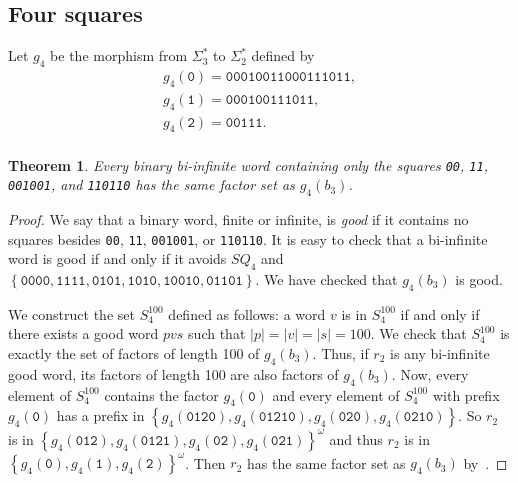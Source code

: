 \documentclass{article}
\def\acc#1{\left\{ #1 \right\}}
\theoremstyle{plain}
\newtheorem{theorem}{Theorem}
\theoremstyle{definition}
\theoremstyle{remark}
\begin{document}
\subsection{Four squares}\label{ssec:4sq}
Let $g_4$ be the morphism from $\Sigma_3^*$ to $\Sigma_2^*$ defined by
$$\begin{array}{l}
 g_4(\texttt{0})=\texttt{00010011000111011},\\
 g_4(\texttt{1})=\texttt{000100111011},\\
 g_4(\texttt{2})=\texttt{00111}.\\
\end{array}$$

\begin{theorem}
Every binary bi-infinite word containing only the squares \textnormal{\texttt{00}}, \textnormal{\texttt{11}},
\textnormal{\texttt{001001}}, and \textnormal{\texttt{110110}} has the same factor set as $g_4(b_3)$.
\end{theorem}

\begin{proof}
We say that a binary word, finite or infinite, is \emph{good} if it contains no squares besides 
\texttt{00}, \texttt{11}, \texttt{001001}, or \texttt{110110}.
It is easy to check that a bi-infinite word is good if and only if it
avoids $SQ_4$ and $\acc{\texttt{0000},\texttt{1111},\texttt{0101},\texttt{1010},\texttt{10010},\texttt{01101}}$.
We have checked that $g_4(b_3)$ is good.

We construct the set $S_4^{100}$ defined as follows:
a word $v$ is in $S_4^{100}$ if and only if there exists a good word $pvs$ such that $|p|=|v|=|s|=100$.
We check that $S_4^{100}$ is exactly the set of factors of length 100 of $g_4(b_3)$.
Thus, if $r_2$ is any bi-infinite good word, its factors of length 100
are also factors of $g_4(b_3)$.
Now, every element of $S_4^{100}$ contains the factor $g_4(\texttt{0})$
and every element of $S_4^{100}$ with prefix $g_4(\texttt{0})$ has a prefix in $\acc{g_4(\texttt{0120}),g_4(\texttt{01210}),g_4(\texttt{020}),g_4(\texttt{0210})}$.
So $r_2$ is in $\acc{g_4(\texttt{012}),g_4(\texttt{0121}),g_4(\texttt{02}),g_4(\texttt{021})}^\omega$
and thus $r_2$ is in $\acc{g_4(\texttt{0}),g_4(\texttt{1}),g_4(\texttt{2})}^\omega$.
Then $r_2$ has the same factor set as $g_4(b_3)$ by~.
\end{proof}
% 
\end{document}

